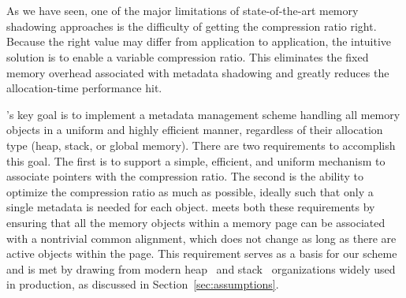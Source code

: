 \section{\projectname{}}
\label{sec:metalloc}

As we have seen, one of the major limitations of state-of-the-art
memory shadowing approaches is the difficulty of getting the compression ratio right.
Because the right value may differ from application to application, the
intuitive solution is to enable a variable compression ratio.
This eliminates the fixed memory overhead associated with metadata shadowing
and greatly reduces the allocation-time performance hit.

\projectname{}'s key goal is to implement a metadata management scheme
handling all memory objects in a uniform and highly efficient manner, regardless of
their allocation type (heap, stack, or global memory).
There are two requirements 
to accomplish this goal.
The first is to support a simple, efficient, and uniform mechanism
to associate pointers with the compression ratio. The second is the
ability to optimize the compression ratio as much as possible, ideally such that only a single
metadata is needed for each object. \projectname{} meets both these requirements
by ensuring that all the memory objects within a memory page can be
associated with a nontrivial common alignment, which does not change
as long as there are active objects within the page. 
This requirement serves as a basis for our scheme and is met
by drawing from modern heap~\cite{ghemawat2009tcmalloc} and stack~\cite{kuznetsov2014cpi} organizations
widely used in production, as discussed in Section~\ref{sec:assumptions}.

